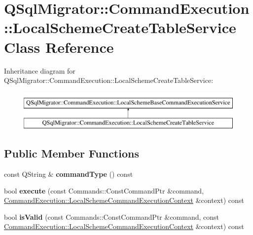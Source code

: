 \hypertarget{class_q_sql_migrator_1_1_command_execution_1_1_local_scheme_create_table_service}{}\section{Q\+Sql\+Migrator\+:\+:Command\+Execution\+:\+:Local\+Scheme\+Create\+Table\+Service Class Reference}
\label{class_q_sql_migrator_1_1_command_execution_1_1_local_scheme_create_table_service}
Inheritance diagram for Q\+Sql\+Migrator\+:\+:Command\+Execution\+:\+:Local\+Scheme\+Create\+Table\+Service\+:\begin{figure}[H]
\begin{center}
\leavevmode
\includegraphics[height=2.000000cm]{class_q_sql_migrator_1_1_command_execution_1_1_local_scheme_create_table_service}
\end{center}
\end{figure}
\subsection*{Public Member Functions}
\begin{DoxyCompactItemize}
\item 
\mbox{\label{class_q_sql_migrator_1_1_command_execution_1_1_local_scheme_create_table_service_a5e64c1a57ea0c00d21c1f6025699cf54}} 
const Q\+String \& {\bfseries command\+Type} () const
\item 
\mbox{\label{class_q_sql_migrator_1_1_command_execution_1_1_local_scheme_create_table_service_a86c8854d061581d946cf9c9c55f30812}} 
bool {\bfseries execute} (const Commands\+::\+Const\+Command\+Ptr \&command, \hyperlink{class_q_sql_migrator_1_1_command_execution_1_1_local_scheme_command_execution_context}{Command\+Execution\+::\+Local\+Scheme\+Command\+Execution\+Context} \&context) const
\item 
\mbox{\label{class_q_sql_migrator_1_1_command_execution_1_1_local_scheme_create_table_service_a8dbbc29d61a7cc72e6333433fc992a1e}} 
bool {\bfseries is\+Valid} (const Commands\+::\+Const\+Command\+Ptr \&command, const \hyperlink{class_q_sql_migrator_1_1_command_execution_1_1_local_scheme_command_execution_context}{Command\+Execution\+::\+Local\+Scheme\+Command\+Execution\+Context} \&context) const
\end{DoxyCompactItemize}


